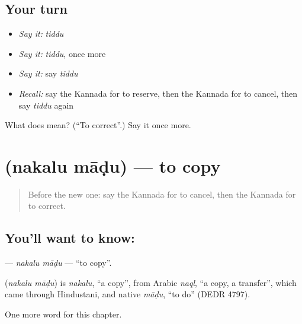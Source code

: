 \subsection*{Your turn}
\begin{itemize}
\raggedright
  \item \emph{Say it:} \emph{tiddu}
  \item \emph{Say it:} \emph{tiddu}, once more
  \item \emph{Say it:} say \emph{tiddu}
  \item \emph{Recall:} say the Kannada for to reserve, then the Kannada for to cancel, then say \emph{tiddu} again
\end{itemize}

\begin{tcolorbox}[breakable,colback=teal!4,colframe=teal!35!black,title={Before you move on}]
What does  mean? (\textquotedblleft{}To correct\textquotedblright{}.) Say it once more.
\end{tcolorbox}
\section[\texorpdfstring{\kn{ನಕಲು} \kn{ಮಾಡು} (nakalu māḍu)}{ನಕಲು ಮಾಡು (nakalu māḍu)}]{  (nakalu māḍu) — to copy}

\label{lesson:KA-C162-nakalu-madu}



\begin{quote}
Before the new one: say the Kannada for to cancel, then the Kannada for to correct.
\end{quote}

\subsection*{You'll want to know:  }
\textbf{ } — \emph{nakalu māḍu} — \textquotedblleft{}to copy\textquotedblright{}.

\begin{cousinweb}
\textbf{ } (\emph{nakalu māḍu}) is \emph{nakalu}, \textquotedblleft{}a copy\textquotedblright{}, from Arabic \emph{naql}, \textquotedblleft{}a copy, a transfer\textquotedblright{}, which came through Hindustani, and native \emph{māḍu}, \textquotedblleft{}to do\textquotedblright{} (DEDR 4797).
\end{cousinweb}

\begin{grammarlens}[title={What you've built}]
One more word for this chapter.
\end{grammarlens}

